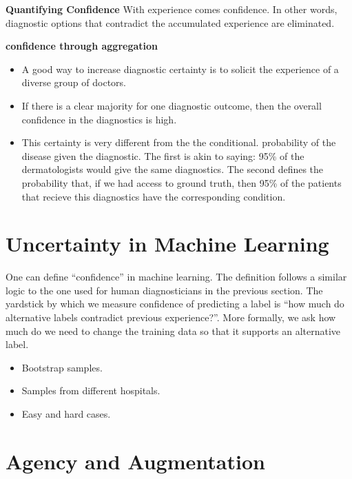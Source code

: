 \documentclass[9pt,twocolumn,twoside]{pnas-new}
\begin{document}
  {\bf Quantifying Confidence} With experience comes confidence. In
  other words, diagnostic options that contradict the accumulated
  experience are eliminated.
  
  {\bf confidence through aggregation}
  \begin{itemize}
    \item A good way to increase diagnostic certainty is to solicit
      the experience of a diverse group of doctors.
    \item If there is a clear majority for one diagnostic outcome,
      then the overall confidence in the diagnostics is high.
    \item This certainty is very different from the the conditional.
      probability of the disease given the diagnostic. The first is
      akin to saying: 95\% of the dermatologists would give the same
      diagnostics. The second defines the probability that, if we had
      access to ground truth, then 95\% of the patients that recieve
      this diagnostics have the corresponding condition.
    \end{itemize}
    
\section*{Uncertainty in Machine Learning}

One can define ``confidence'' in machine learning. The definition follows a
similar logic to the one used for human diagnosticians in the previous
section. The yardstick by which we measure confidence of predicting a
label is ``how much do alternative labels contradict previous
experience?''.
More formally, we ask how much do we need to change the training data
so that it supports an alternative label.




\begin{itemize}
  \item Bootstrap samples.
  \item Samples from different hospitals.
  \item Easy and hard cases.
  \end{itemize}

  \section*{Agency and Augmentation}
\end{document}
